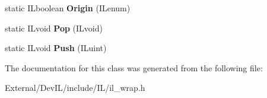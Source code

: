 \begin{DoxyCompactItemize}
\item 
\hypertarget{classilState_aee802bef060eb301f5ee41e76e0d365b}{
static ILboolean {\bfseries Origin} (ILenum)}
\label{classilState_aee802bef060eb301f5ee41e76e0d365b}

\item 
\hypertarget{classilState_a9e4ce13beff68c68a632509989c99def}{
static ILvoid {\bfseries Pop} (ILvoid)}
\label{classilState_a9e4ce13beff68c68a632509989c99def}

\item 
\hypertarget{classilState_ac0196b03ec0b8424a48299ec1f730308}{
static ILvoid {\bfseries Push} (ILuint)}
\label{classilState_ac0196b03ec0b8424a48299ec1f730308}

\end{DoxyCompactItemize}


The documentation for this class was generated from the following file:\begin{DoxyCompactItemize}
\item 
External/DevIL/include/IL/il\_\-wrap.h\end{DoxyCompactItemize}
